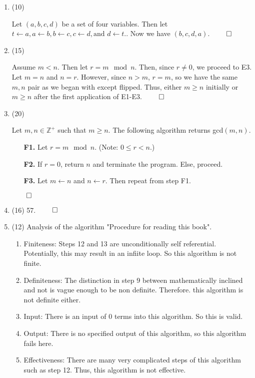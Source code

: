\documentclass[Main.tex]{subfiles}
\begin{document}
\begin{enumerate}
    \item (10)
    
        Let $(a,b,c,d)$ be a set of four variables. Then let $t\leftarrow a, a\leftarrow b, b\leftarrow c, c\leftarrow d, \text{and } d\leftarrow t.$. Now we have $(b,c,d,a)$. $\hfill\qed$
    
    \item (15)
    
        Assume $m<n$. Then let $r = m \mod{n}$. Then, since $r \not= 0$, we proceed to E3. Let $m = n$ and $n = r$. However, since $n>m$, $r = m$, so we have the same $m,n$ pair as we began with except flipped. Thus, either $m \geq n$ initially or $m \geq n$ after the first application of E1-E3. $\hfill\qed$
    
    \item (20)
    
        Let $m,n\in\mathbb{Z}^+$ such that $m \geq n$. The following algorithm returns gcd$(m,n)$.
        \begin{enumerate}
            \item[\textbf{F1.}] Let $r = m \mod{n}$. (Note: $0 \leq r < n$.)
            \item[\textbf{F2.}] If $r=0$, return $n$ and terminate the program. Else, proceed.
            \item[\textbf{F3.}] Let $m\leftarrow n$ and $n\leftarrow r$. Then repeat from step F1.
        \end{enumerate} $\hfill\qed$
    
    \item (16) 57. $\hfill\qed$
    
    \item (12) Analysis of the algorithm "Procedure for reading this book".
    
    \begin{enumerate}[label=\arabic*)]
        \item Finiteness: Steps 12 and 13 are unconditionally self referential. Potentially, this may result in an infiite loop. So this algorithm is not finite.
        \item Definiteness: The distinction in step 9 between mathematically inclined and not is vague enough to be non definite. Therefore. this algorithm is not definite either.
        \item Input: There is an input of 0 terms into this algorithm. So this is valid.
        \item Output: There is no specified output of this algorithm, so this algorithm fails here.
        \item Effectiveness: There are many very complicated steps of this algorithm such as step 12. Thus, this algorithm is not effective.
    \end{enumerate}
    

\end{enumerate}
\end{document}
